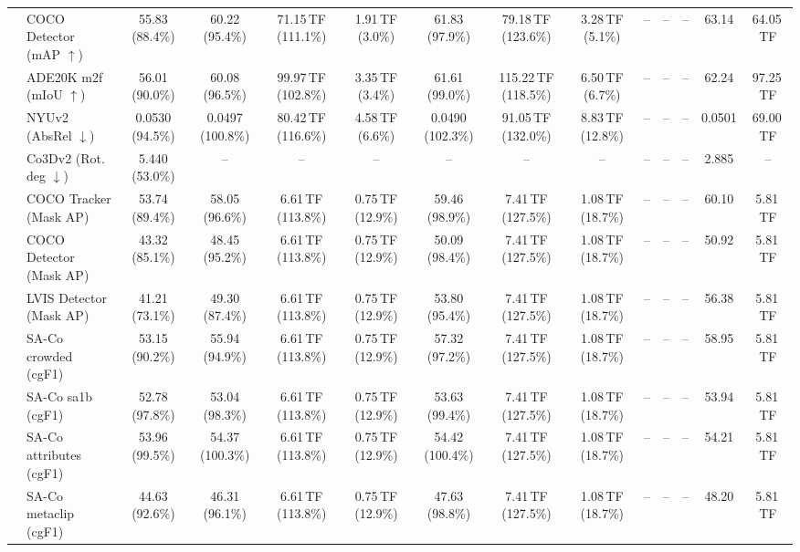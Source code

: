 \begin{table}[t]
\begin{center}
\begin{small}
\begin{sc}
{\begin{tabular}{llcccccccccccc}
& COCO Detector (mAP $\uparrow$) & 55.83 (88.4\%) & 60.22 (95.4\%) & 71.15\,TF (111.1\%) & 1.91\,TF (3.0\%) & 61.83 (97.9\%) & 79.18\,TF (123.6\%) & 3.28\,TF (5.1\%) & -- & -- & -- & 63.14 & 64.05\,TF \\
& ADE20K m2f (mIoU $\uparrow$) & 56.01 (90.0\%) & 60.08 (96.5\%) & 99.97\,TF (102.8\%) & 3.35\,TF (3.4\%) & 61.61 (99.0\%) & 115.22\,TF (118.5\%) & 6.50\,TF (6.7\%) & -- & -- & -- & 62.24 & 97.25\,TF \\
& NYUv2 (AbsRel $\downarrow$) & 0.0530 (94.5\%) & 0.0497 (100.8\%) & 80.42\,TF (116.6\%) & 4.58\,TF (6.6\%) & 0.0490 (102.3\%) & 91.05\,TF (132.0\%) & 8.83\,TF (12.8\%) & -- & -- & -- & 0.0501 & 69.00\,TF \\
& Co3Dv2 (Rot. deg $\downarrow$) & 5.440 (53.0\%) & -- & -- & -- & -- & -- & -- & -- & -- & -- & 2.885 & -- \\
\midrule
{}
& COCO Tracker (Mask AP) & 53.74 (89.4\%) & 58.05 (96.6\%) & 6.61\,TF (113.8\%) & 0.75\,TF (12.9\%) & 59.46 (98.9\%) & 7.41\,TF (127.5\%) & 1.08\,TF (18.7\%) & -- & -- & -- & 60.10 & 5.81\,TF \\
& COCO Detector (Mask AP) & 43.32 (85.1\%) & 48.45 (95.2\%) & 6.61\,TF (113.8\%) & 0.75\,TF (12.9\%) & 50.09 (98.4\%) & 7.41\,TF (127.5\%) & 1.08\,TF (18.7\%) & -- & -- & -- & 50.92 & 5.81\,TF \\
& LVIS Detector (Mask AP) & 41.21 (73.1\%) & 49.30 (87.4\%) & 6.61\,TF (113.8\%) & 0.75\,TF (12.9\%) & 53.80 (95.4\%) & 7.41\,TF (127.5\%) & 1.08\,TF (18.7\%) & -- & -- & -- & 56.38 & 5.81\,TF \\
& SA-Co crowded (cgF1) & 53.15 (90.2\%) & 55.94 (94.9\%) & 6.61\,TF (113.8\%) & 0.75\,TF (12.9\%) & 57.32 (97.2\%) & 7.41\,TF (127.5\%) & 1.08\,TF (18.7\%) & -- & -- & -- & 58.95 & 5.81\,TF \\
& SA-Co sa1b (cgF1) & 52.78 (97.8\%) & 53.04 (98.3\%) & 6.61\,TF (113.8\%) & 0.75\,TF (12.9\%) & 53.63 (99.4\%) & 7.41\,TF (127.5\%) & 1.08\,TF (18.7\%) & -- & -- & -- & 53.94 & 5.81\,TF \\
& SA-Co attributes (cgF1) & 53.96 (99.5\%) & 54.37 (100.3\%) & 6.61\,TF (113.8\%) & 0.75\,TF (12.9\%) & 54.42 (100.4\%) & 7.41\,TF (127.5\%) & 1.08\,TF (18.7\%) & -- & -- & -- & 54.21 & 5.81\,TF \\
& SA-Co metaclip (cgF1) & 44.63 (92.6\%) & 46.31 (96.1\%) & 6.61\,TF (113.8\%) & 0.75\,TF (12.9\%) & 47.63 (98.8\%) & 7.41\,TF (127.5\%) & 1.08\,TF (18.7\%) & -- & -- & -- & 48.20 & 5.81\,TF \\

\end{tabular}}
\end{sc}
\end{small}
\end{center}
\end{table}

